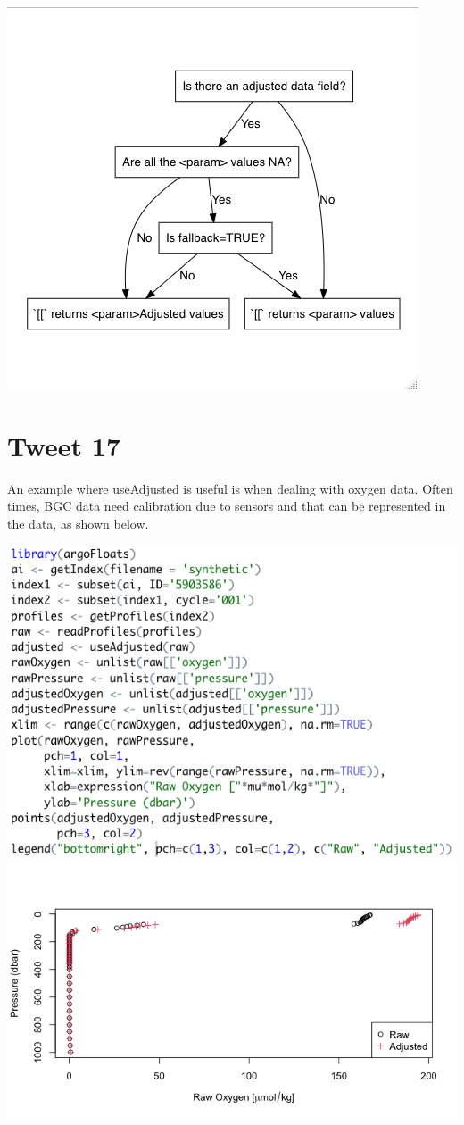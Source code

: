 \documentclass[
]{article}
\begin{document}
\includegraphics{../../../man/figures/useAdjustedDiagram.png}

\hypertarget{tweet-17}{%
\section{Tweet 17}\label{tweet-17}}

An example where useAdjusted is useful is when dealing with oxygen data.
Often times, BGC data need calibration due to sensors and that can be
represented in the data, as shown below.

\includegraphics{../18_tweets/useAdjustedCode.png}
\includegraphics{../18_tweets/useAdjusted.png}
\end{document}
